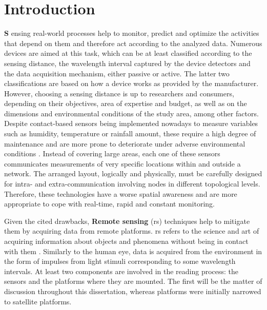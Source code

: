 \setchapterpreamble[u]{\margintoc}
\chapter{Introduction}

\lettrine[findent=0pt, lines=3]{\textbf{S}}{ }ensing real-world processes help to monitor, predict and optimize the activities that depend on them and therefore act according to the analyzed data. Numerous devices are aimed at this task, which can be at least classified according to the sensing distance, the wavelength interval captured by the device detectors and the data acquisition mechanism, either passive or active. The latter two classifications are based on how a device works as provided by the manufacturer. However, choosing a sensing distance is up to researchers and consumers, depending on their objectives, area of expertise and budget, as well as on the dimensions and environmental conditions of the study area, among other factors. Despite contact-based sensors being implemented nowadays to measure variables such as humidity, temperature or rainfall amount, these require a high degree of maintenance and are more prone to deteriorate under adverse environmental conditions \cite{silva_low-cost_2019, morais_versatile_2021}. Instead of covering large areas, each one of these sensors communicates measurements of very specific locations within and outside a network. The arranged layout, logically and physically, must be carefully designed for intra- and extra-communication involving nodes in different topological levels. Therefore, these technologies have a worse spatial awareness and are more appropriate to cope with real-time, rapid and constant monitoring. 

Given the cited drawbacks, \textbf{Remote sensing} (\acrshort{rs}) techniques help to mitigate them by acquiring data from remote platforms. \acrshort{rs} refers to the science and art of acquiring information about objects and phenomena without being in contact with them \cite{lillesand_remote_2015}. Similarly to the human eye, data is acquired from the environment in the form of impulses from light stimuli corresponding to some wavelength intervals. At least two components are involved in the reading process: the sensors and the platforms where they are mounted. The first will be the matter of discussion throughout this dissertation, whereas platforms were initially narrowed to satellite platforms. 


